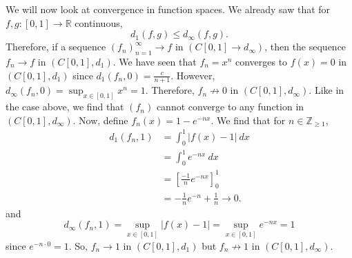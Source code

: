 \documentclass[a4paper, openany]{memoir}
\theoremstyle{definition}
\theoremstyle{plain}
\begin{document}
We will now look at convergence in function spaces. We already saw that for $f, g: [0, 1] \to \mathbb{R}$ continuous,
\[d_1(f, g) \leqslant d_\infty(f, g).\]
Therefore, if a sequence $(f_n)_{n=1}^{\infty} \to f$ in $(C[0, 1] \to d_\infty)$, then the sequence $f_n \to f$ in $(C[0, 1], d_1)$. We have seen that $f_n = x^n$ converges to $f(x) = 0$ in $(C[0, 1], d_1)$ since $d_1(f_n, 0) = \frac{c}{n+1}$. However, $d_\infty(f_n, 0) = \sup_{x \in [0, 1]} x^n = 1$. Therefore, $f_n \not\to 0$ in $(C[0, 1], d_\infty)$. Like in the case above, we find that $(f_n)$ cannot converge to any function in $(C[0, 1], d_\infty)$. Now, define $f_n(x) = 1 - e^{-nx}$. We find that for $n \in \mathbb{Z}_{\geqslant 1}$,
\begin{align*}
    d_1(f_n, 1) &= \int_0^1 |f(x) - 1| \ dx \\
    &= \int_0^1 e^{-nx} \ dx \\
    &= \left[\frac{-1}{n} e^{-nx}\right]_0^1 \\
    &= -\frac{1}{n} e^{-n} + \frac{1}{n} \to 0.
\end{align*}
and
\[d_\infty(f_n, 1) = \sup_{x \in [0, 1]} |f(x) - 1| = \sup_{x \in [0, 1]} e^{-nx} = 1\]
since $e^{-n \cdot 0} = 1$. So, $f_n \to 1$ in $(C[0, 1], d_1)$ but $f_n \not\to 1$ in $(C[0, 1], d_\infty)$.
\newpage
\end{document}
